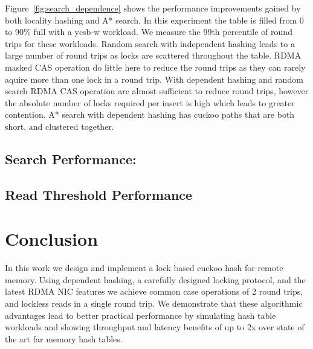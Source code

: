 Figure~\ref{fig:search_dependence} shows the performance
improvements gained by both locality hashing and A* search.
In this experiment the table is filled from 0 to 90\% full
with a ycsb-w workload. We measure the 99th percentile of
round trips for these workloads. Random search with
independent hashing leads to a large number of round trips
as locks are scattered throughout the table. RDMA masked CAS
operation do little here to reduce the round trips as they
can rarely aquire more than one lock in a round trip. With
dependent hashing and random search RDMA CAS operation are
almost sufficient to reduce round trips, however the absolute
number of locks required per insert is high which leads to
greater contention. A* search with dependent hashing has
cuckoo paths that are both short, and clustered together.



\subsection{Search Performance:}



\subsection{Read Threshold Performance} 



\section{Conclusion}
\label{sec:conclusion}

In this work we design and implement a lock based cuckoo
hash for remote memory. Using dependent hashing, a carefully
designed locking protocol, and the latest RDMA NIC features
we achieve common case operations of 2 round trips, and
lockless reads in a single round trip. We demonstrate that
these algorithmic advantages lead to better practical
performance by simulating hash table workloads and showing
throughput and latency benefits of up to 2x over state of
the art far memory hash tables.
